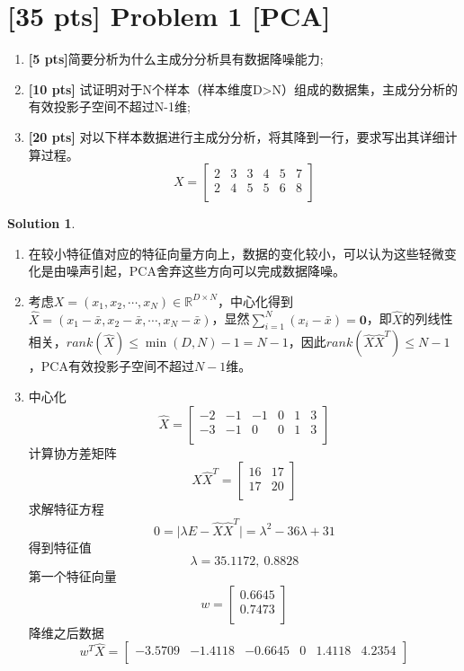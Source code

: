 \documentclass[a4paper,UTF8]{article}
\theoremstyle{definition}
\newtheorem*{solution}{Solution}
\begin{document}
\newpage

\section*{\textbf{[35 pts]} Problem 1 [PCA]}

\begin{enumerate}[(1)]\item \textbf{[5 pts]}简要分析为什么主成分分析具有数据降噪能力;
	\item \textbf{[10 pts]} 试证明对于N个样本（样本维度D>N）组成的数据集，主成分分析的有效投影子空间不超过N-1维;
	\item \textbf{[20 pts]} 对以下样本数据进行主成分分析，将其降到一行，要求写出其详细计算过程。
\begin{equation}
	X=
 \left[
 \begin{array}{cccccc}
     2 & 3 & 3 &4 &5 &7 \\
    2 &4 &5 &5 &6 &8 \\
 \end{array}
 \right]        
 \end{equation}
	
	
\end{enumerate}

\begin{solution}
	~\\
	\begin{enumerate}[(1)]
		\item 
		在较小特征值对应的特征向量方向上，数据的变化较小，可以认为这些轻微变化是由噪声引起，PCA舍弃这些方向可以完成数据降噪。
		\item 
		考虑$X=(x_1,x_2,\cdots,x_N) \in \mathbb{R}^{D \times N}$，中心化得到$\hat{X}=(x_1-\bar{x},x_2-\bar{x},\cdots,x_N-\bar{x})$，显然$\sum_{i=1}^N(x_i-\bar{x})=\textbf{0}$，即$\hat{X}$的列线性相关，$rank(\hat{X})\leq\min(D,N)-1=N-1$，因此$rank(\hat{X}\hat{X}^T)\leq N-1$，PCA有效投影子空间不超过$N-1$维。
		\item 
		中心化
		\[\hat{X}=\left[
		\begin{array}{cccccc}
		-2 & -1 & -1 & 0 & 1 & 3\\
		-3 & -1 &  0 & 0 & 1 & 3\\
		\end{array}
		\right]\]
		计算协方差矩阵
		\[\hat{X}\hat{X}^T=\left[
		\begin{array}{cc}
		16 & 17\\
		17 & 20\\
		\end{array}
		\right]\]
		求解特征方程
		\[0=\vert\lambda E-\hat{X}\hat{X}^T\vert=\lambda^2-36\lambda+31\]
		得到特征值
		\[\lambda=35.1172,\ 0.8828\]
		第一个特征向量
		\[w=\left[
		\begin{array}{c}
		0.6645\\
		0.7473\\
		\end{array}
		\right]\]
		降维之后数据
		\[w^T\hat{X}=\left[
		\begin{array}{cccccc}
		-3.5709 & -1.4118 & -0.6645 & 0 & 1.4118 & 4.2354\\
		\end{array}
		\right]\]
	\end{enumerate}
\end{solution}
\end{document}
